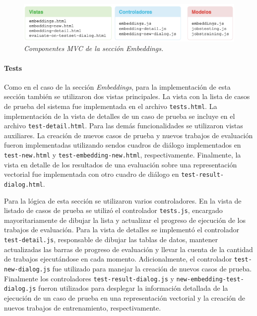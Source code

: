 \begin{figure}[h]
    \centering
    \includegraphics[width=\textwidth]{images/ui-nabu-mvc-embeddings}
    \caption{\textit{Componentes MVC de la sección Embeddings.}}
    \label{fig:ui-nabu-mvc-embeddings}
\end{figure}

\paragraph{Tests}

Como en el caso de la sección \textit{Embeddings}, para la implementación de esta sección también se
utilizaron dos vistas principales. La vista con la lista de casos de prueba del sistema fue implementada en
el archivo \texttt{tests.html}. La implementación de la vista de detalles de un caso de prueba se incluye
en el archivo \texttt{test-detail.html}. Para las demás funcionalidades se utilizaron vistas auxiliares. La
creación de nuevos casos de prueba y nuevos trabajos de evaluación fueron implementadas utilizando sendos
cuadros de diálogo implementados en \texttt{test-new.html} y \texttt{test-embedding-new.html},
respectivamente. Finalmente, la vista en detalle de los resultados de una evaluación sobre una
representación vectorial fue implementada con otro cuadro de diálogo en \texttt{test-result-dialog.html}.

Para la lógica de esta sección se utilizaron varios controladores. En la vista de listado de casos de
prueba se utilizó el controlador \texttt{tests.js}, encargado mayoritariamente de dibujar la lista y
actualizar el progreso de ejecución de los trabajos de evaluación. Para la vista de detalles se implementó
el controlador \texttt{test-detail.js}, responsable de dibujar las tablas de datos, mantener actualizadas
las barras de progreso de evaluación y llevar la cuenta de la cantidad de trabajos ejecutándose en cada
momento. Adicionalmente, el controlador \texttt{test-new-dialog.js} fue utilizado para manejar la creación
de nuevos casos de prueba. Finalmente los controladores \texttt{test-result-dialog.js} y
\texttt{new-embedding-test-dialog.js} fueron utilizados para desplegar la información detallada de la
ejecución de un caso de prueba en una representación vectorial y la creación de nuevos trabajos de
entrenamiento, respectivamente.

